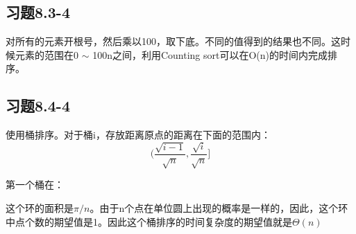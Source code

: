 \documentclass[a4paper, 11pt]{article}
\begin{document}
\subsection{习题8.3-4}

对所有的元素开根号，然后乘以100，取下底。不同的值得到的结果也不同。这时候元素的范围在0 $\sim$ 100n之间，利用Counting sort可以在O(n)的时间内完成排序。

\subsection{习题8.4-4}

使用桶排序。对于桶i，存放距离原点的距离在下面的范围内：
\begin{displaymath}
	(\frac{\sqrt{i - 1}}{\sqrt{n}}, \frac{\sqrt{i}}{\sqrt{n}}]
\end{displaymath}

第一个桶在：
\begin{displaymath}
	[0, \frac{\sqrt{1}}{\sqrt{n}}]
\end{displaymath}

这个环的面积是$\pi/n$。由于n个点在单位圆上出现的概率是一样的，因此，这个环中点个数的期望值是1。因此这个桶排序的时间复杂度的期望值就是$\Theta(n)$
\end{document}
